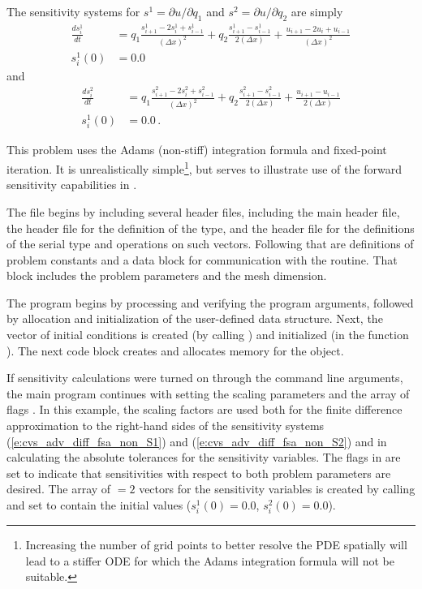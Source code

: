 The sensitivity systems for $s^1 = \partial u / \partial q_1$ and
$s^2 = \partial u / \partial q_2$ are simply
\begin{equation}\label{e:cvs_adv_diff_fsa_non_S1}
  \begin{split}
    \frac{d s^1_i}{dt} 
    &= q_1 \frac{s^1_{i+1}-2s^1_{i}+s^1_{i-1}}{(\Delta x)^{2}}
    + q_2 \frac{s^1_{i+1}-s^1_{i-1}}{2(\Delta x)} 
    + \frac{u_{i+1}-2u_{i}+u_{i-1}}{(\Delta x)^{2}} \\
    s^1_i (0) &= 0.0 
  \end{split}
\end{equation}
and
\begin{equation}\label{e:cvs_adv_diff_fsa_non_S2}
  \begin{split}
    \frac{d s^2_i}{dt} 
    &= q_1 \frac{s^2_{i+1}-2s^2_{i}+s^2_{i-1}}{(\Delta x)^{2}}
    + q_2 \frac{s^2_{i+1}-s^2_{i-1}}{2(\Delta x)} 
    + \frac{u_{i+1}-u_{i-1}}{2(\Delta x)} \\
    s^1_i (0) &= 0.0  \, .
  \end{split}
\end{equation}

This problem uses the Adams (non-stiff) integration formula and fixed-point iteration.
It is unrealistically simple\footnote{Increasing the number of grid points to better
resolve the PDE spatially will lead to a stiffer ODE for which the Adams integration
formula will not be suitable.},
but serves to illustrate use of the forward sensitivity capabilities in {\cvodes}.

The  file begins by including several header files, including 
the main {\cvodes} header file, the  header file for the
definition of the  type, and the {\nvecs} header file 
for the definitions of the serial  type and operations on such vectors.
Following that are definitions of problem constants and a data block for communication
with the  routine.  That block includes the problem parameters and the mesh 
dimension.

The  program begins by processing and verifying the program arguments,
followed by allocation and initialization of the user-defined data structure. Next, the
vector of initial conditions is created (by calling ) and
initialized (in the function ). The next code block creates and allocates
memory for the {\cvodes} object. 

If sensitivity calculations were turned on through the command line arguments,
the main program continues with setting the scaling parameters
 and the array of flags . In this example,
the scaling factors  are used both for the finite difference approximation
to the right-hand sides of the sensitivity systems (\ref{e:cvs_adv_diff_fsa_non_S1}) 
and (\ref{e:cvs_adv_diff_fsa_non_S2}) and in calculating the absolute tolerances for the 
sensitivity variables. 
The flags in  are set to indicate that sensitivities with respect to both 
problem parameters are desired.
The array of  $=2$ vectors  for the sensitivity variables is created
by calling  and set to contain the initial values
($s^1_i(0) = 0.0$, $s^2_i(0) = 0.0$).

